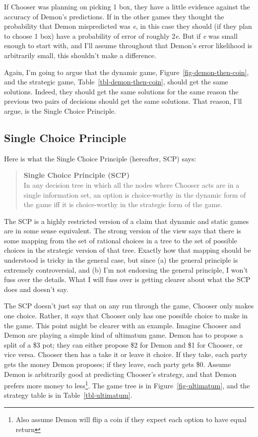 \documentclass[
  11pt,
  letterpaper,
  DIV=11,
  numbers=noendperiod,
  twoside]{scrartcl}
\begin{document}
If Chooser was planning on picking 1 box, they have a little evidence
against the accuracy of Demon's predictions. If in the other games they
thought the probability that Demon mispredicted was \emph{e}, in this
case they should (if they plan to choose 1 box) have a probability of
error of roughly 2\emph{e}. But if \emph{e} was small enough to start
with, and I'll assume throughout that Demon's error likelihood is
arbitrarily small, this shouldn't make a difference.

Again, I'm going to argue that the dynamic game,
Figure~\ref{fig-demon-then-coin}, and the strategic game,
Table~\ref{tbl-demon-then-coin}, should get the same solutions. Indeed,
they should get the same solutions for the same reason the previous two
pairs of decisions should get the same solutions. That reason, I'll
argue, is the Single Choice Principle.

\subsection{Single Choice Principle}\label{sec-scp-definition}

Here is what the Single Choice Principle (hereafter, SCP) says:

\begin{quote}
\textbf{Single Choice Principle (SCP)}\\
In any decision tree in which all the nodes where Chooser acts are in a
single information set, an option is choice-worthy in the dynamic form
of the game iff it is choice-worthy in the strategic form of the game.
\end{quote}

The SCP is a highly restricted version of a claim that dynamic and
static games are in some sense equivalent. The strong version of the
view says that there is some mapping from the set of rational choices in
a tree to the set of possible choices in the strategic version of that
tree. Exactly how that mapping should be understood is tricky in the
general case, but since (a) the general principle is extremely
controversial, and (b) I'm not endorsing the general principle, I won't
fuss over the details. What I will fuss over is getting clearer about
what the SCP does and doesn't say.

The SCP doesn't just say that on any run through the game, Chooser only
makes one choice. Rather, it says that Chooser only has one possible
choice to make in the game. This point might be clearer with an example.
Imagine Chooser and Demon are playing a simple kind of ultimatum game.
Demon has to propose a split of a \$3 pot; they can either propose \$2
for Demon and \$1 for Chooser, or vice versa. Chooser then has a take it
or leave it choice. If they take, each party gets the money Demon
proposes; if they leave, each party gets \$0. Assume Demon is
arbitrarily good at predicting Chooser's strategy, and that Demon
prefers more money to less\footnote{Also assume Demon will flip a coin
  if they expect each option to have equal return}. The game tree is in
Figure~\ref{fig-ultimatum}, and the strategy table is in
Table~\ref{tbl-ultimatum}.
\end{document}
